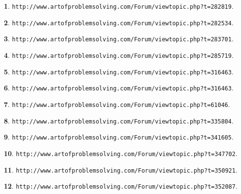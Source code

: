 \documentclass{article}
\theoremstyle{definition}
\newtheorem{s}{}
\begin{document}
\begin{s}
\texttt{http://www.artofproblemsolving.com/Forum/viewtopic.php?t=282819}.
\end{s}




\begin{s}
\texttt{http://www.artofproblemsolving.com/Forum/viewtopic.php?t=282534}.
\end{s}





\begin{s}
\texttt{http://www.artofproblemsolving.com/Forum/viewtopic.php?t=283701}.
\end{s}




\begin{s}
\texttt{http://www.artofproblemsolving.com/Forum/viewtopic.php?t=285719}.
\end{s}


\begin{s}
\texttt{http://www.artofproblemsolving.com/Forum/viewtopic.php?t=316463}.
\end{s}





\begin{s}
\texttt{http://www.artofproblemsolving.com/Forum/viewtopic.php?t=316463}.
\end{s}




\begin{s}
\texttt{http://www.artofproblemsolving.com/Forum/viewtopic.php?t=61046}.
\end{s}




\begin{s}
\texttt{http://www.artofproblemsolving.com/Forum/viewtopic.php?t=335804}.
\end{s}





\begin{s}
\texttt{http://www.artofproblemsolving.com/Forum/viewtopic.php?t=341605}.
\end{s}




\begin{s}
\texttt{http://www.artofproblemsolving.com/Forum/viewtopic.php?t=347702}.
\end{s}




\begin{s}
\texttt{http://www.artofproblemsolving.com/Forum/viewtopic.php?t=350921}.
\end{s}





\begin{s}
\texttt{http://www.artofproblemsolving.com/Forum/viewtopic.php?t=352087}.
\end{s}
\end{document}
